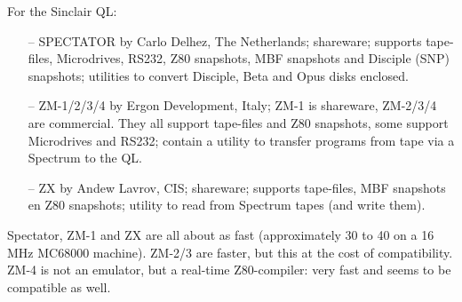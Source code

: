 \newpage
\noindent
    For the Sinclair QL:
\begin{itemize}
  \item[--] SPECTATOR by Carlo Delhez, The Netherlands; shareware; supports
      tape-files, Microdrives, RS232, Z80 snapshots, MBF snapshots and
      Disciple (SNP) snapshots; utilities to convert Disciple, Beta and
      Opus disks enclosed.
  \item[--] ZM-1/2/3/4 by Ergon Development, Italy; ZM-1 is shareware, ZM-2/3/4
      are commercial. They all support tape-files and Z80 snapshots, some
      support Microdrives and RS232; contain a utility to transfer programs
      from tape via a Spectrum to the QL.
  \item[--] ZX by Andew Lavrov, CIS; shareware; supports tape-files, MBF
      snapshots en Z80 snapshots; utility to read from Spectrum tapes
      (and write them).

\end{itemize}
    Spectator, ZM-1 and ZX are all about as fast (approximately 30 to 40%
    on a 16 MHz MC68000 machine). ZM-2/3 are faster, but this at the cost
    of compatibility. ZM-4 is not an emulator, but a real-time Z80-compiler:
    very fast and seems to be compatible as well.\\

